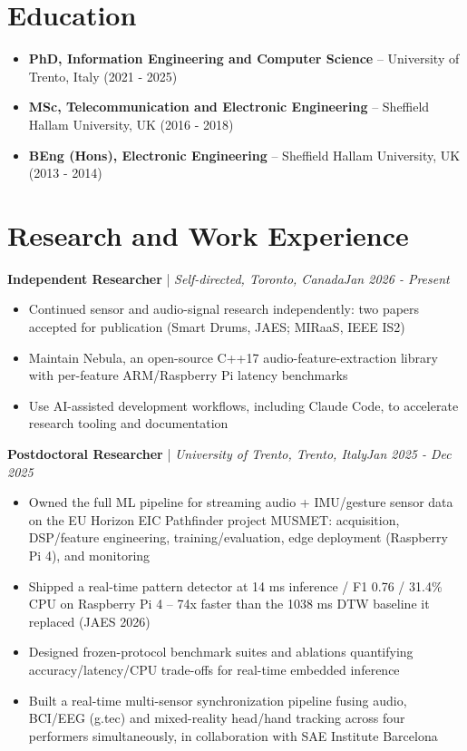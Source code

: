 \documentclass[11pt]{article}
\newenvironment{cvrole}[5]{%
  \par\noindent\textbf{\large #1} | \textit{\small #2, #3}\hfill \textit{\small #4 - #5}\par
  \begin{itemize}[leftmargin=2em, itemsep=-0.3em, topsep=-0.5em]%
}{%
  \end{itemize}\par\noindent\mbox{}\par\vspace{0.1em}%
}
\begin{document}
\section*{Education}
\begin{itemize}[leftmargin=2em, itemsep=-0.3em, topsep=0em]
\item \textbf{PhD, Information Engineering and Computer Science} -- University of Trento, Italy (2021 - 2025)
\item \textbf{MSc, Telecommunication and Electronic Engineering} -- Sheffield Hallam University, UK (2016 - 2018)
\item \textbf{BEng (Hons), Electronic Engineering} -- Sheffield Hallam University, UK (2013 - 2014)
\end{itemize}

\section*{Research and Work Experience}

\begin{cvrole}{Independent Researcher}{Self-directed}{Toronto, Canada}{Jan 2026}{Present}
\item Continued sensor and audio-signal research independently: two papers accepted for publication (Smart Drums, JAES; MIRaaS, IEEE IS2)
\item Maintain Nebula, an open-source C++17 audio-feature-extraction library with per-feature ARM/Raspberry Pi latency benchmarks
\item Use AI-assisted development workflows, including Claude Code, to accelerate research tooling and documentation
\end{cvrole}

\begin{cvrole}{Postdoctoral Researcher}{University of Trento}{Trento, Italy}{Jan 2025}{Dec 2025}
\item Owned the full ML pipeline for streaming audio + IMU/gesture sensor data on the EU Horizon EIC Pathfinder project MUSMET: acquisition, DSP/feature engineering, training/evaluation, edge deployment (Raspberry Pi 4), and monitoring
\item Shipped a real-time pattern detector at 14 ms inference / F1 0.76 / 31.4\% CPU on Raspberry Pi 4 -- 74x faster than the 1038 ms DTW baseline it replaced (JAES 2026)
\item Designed frozen-protocol benchmark suites and ablations quantifying accuracy/latency/CPU trade-offs for real-time embedded inference
\item Built a real-time multi-sensor synchronization pipeline fusing audio, BCI/EEG (g.tec) and mixed-reality head/hand tracking across four performers simultaneously, in collaboration with SAE Institute Barcelona
\end{cvrole}
\end{document}
